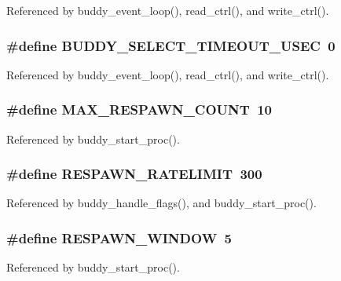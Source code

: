 Referenced by buddy\_\-event\_\-loop(), read\_\-ctrl(), and write\_\-ctrl().

\subsubsection[{BUDDY\_\-SELECT\_\-TIMEOUT\_\-USEC}]{\setlength{\rightskip}{0pt plus 5cm}\#define BUDDY\_\-SELECT\_\-TIMEOUT\_\-USEC~0}\label{buddy_8c_a02e1de4ca64638af47b09371b68039e4}


Referenced by buddy\_\-event\_\-loop(), read\_\-ctrl(), and write\_\-ctrl().

\subsubsection[{MAX\_\-RESPAWN\_\-COUNT}]{\setlength{\rightskip}{0pt plus 5cm}\#define MAX\_\-RESPAWN\_\-COUNT~10}\label{buddy_8c_a3330b9685fba5fbf699f348210aca3d0}


Referenced by buddy\_\-start\_\-proc().

\subsubsection[{RESPAWN\_\-RATELIMIT}]{\setlength{\rightskip}{0pt plus 5cm}\#define RESPAWN\_\-RATELIMIT~300}\label{buddy_8c_adab61537d85775a79c1fb0492057d37e}


Referenced by buddy\_\-handle\_\-flags(), and buddy\_\-start\_\-proc().

\subsubsection[{RESPAWN\_\-WINDOW}]{\setlength{\rightskip}{0pt plus 5cm}\#define RESPAWN\_\-WINDOW~5}\label{buddy_8c_a8b0bab4747bb8d2312a23f4dab4ec48a}


Referenced by buddy\_\-start\_\-proc().



